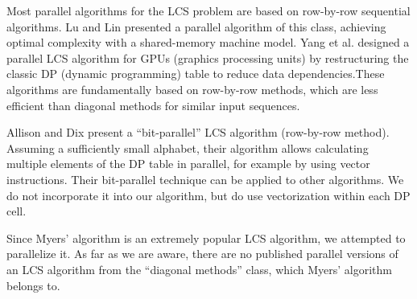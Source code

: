 Most parallel algorithms for the LCS problem are based on row-by-row sequential algorithms. Lu and Lin \cite{mi_lu_parallel_1994} presented a parallel algorithm of this class, achieving optimal complexity with a shared-memory machine model. Yang et al. \cite{jiaoyun_efficient_2010} designed a parallel LCS algorithm for GPUs (graphics processing units) by restructuring the classic DP (dynamic programming) table to reduce data dependencies.\linebreak These algorithms are fundamentally based on row-by-row methods, which are less efficient than diagonal methods for similar input sequences.

Allison and Dix \cite{allison_bit-string_1986} present a ``bit-parallel'' LCS algorithm (row-by-row method). Assuming a sufficiently small alphabet, their algorithm allows calculating multiple elements of the DP table in parallel, for example by using vector instructions. Their bit-parallel technique can be applied to other algorithms. We do not incorporate it into our algorithm, but do use vectorization within each DP cell.

Since Myers' algorithm \cite{myers_anond_1986} is an extremely popular LCS algorithm, we attempted to parallelize it. As far as we are aware, there are no published parallel versions of an LCS algorithm from the ``diagonal methods'' class, which Myers' algorithm belongs to. 